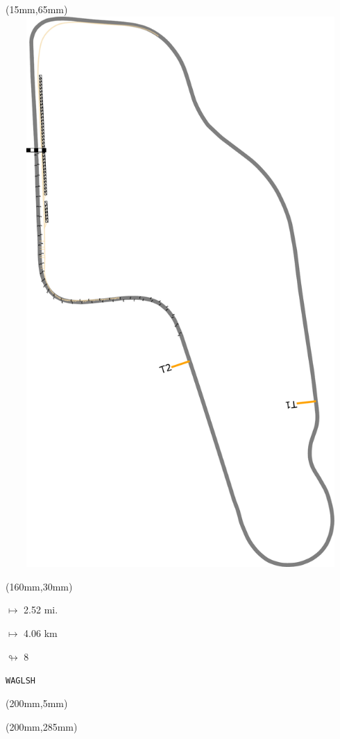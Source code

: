 \begin{textblock*}{185mm}(15mm,65mm)%
\centering
\mbox{\includegraphics[width=185mm,height=210mm,keepaspectratio]{PT/WAGLSH.pdf}}
\end{textblock*}
\begin{textblock*}{40mm}(160mm,30mm)%
\Large
\par$\mapsto$ 2.52 mi.
\par$\mapsto$ 4.06 km
\par$\looparrowright$ 8
\par\hfill\tiny\tt WAGLSH\\
\end{textblock*}
\begin{textblock*}{20mm}(200mm,5mm)%
\fbox{\thepage}
\label{WAGLSH}
\end{textblock*}
\begin{textblock*}{20mm}(200mm,285mm)%
\fbox{\thepage}
\end{textblock*}

